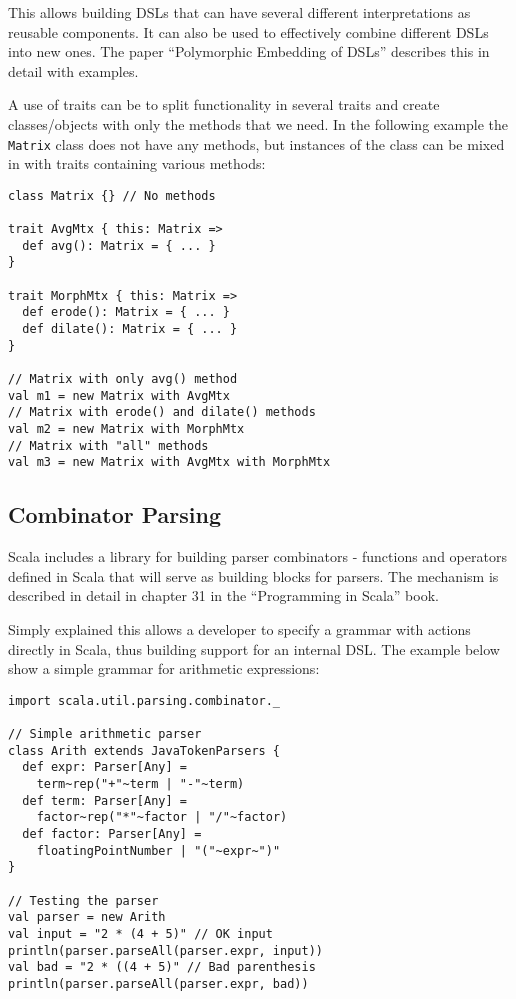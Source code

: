 \documentclass[a4paper,english]{report}
\begin{document}
This allows building DSLs that can have several different
interpretations as reusable components. It can also be used to
effectively combine different DSLs into new ones. The paper
``Polymorphic Embedding of DSLs''\cite{hof08} describes this in detail
with examples.

A use of traits can be to split functionality in several traits and
create classes/objects with only the methods that we need. In the
following example the \texttt{Matrix} class does not have any methods,
but instances of the class can be mixed in with traits containing
various methods:

\begin{lstlisting}
class Matrix {} // No methods

trait AvgMtx { this: Matrix =>
  def avg(): Matrix = { ... }
}

trait MorphMtx { this: Matrix =>
  def erode(): Matrix = { ... }
  def dilate(): Matrix = { ... }
}

// Matrix with only avg() method
val m1 = new Matrix with AvgMtx
// Matrix with erode() and dilate() methods
val m2 = new Matrix with MorphMtx
// Matrix with "all" methods
val m3 = new Matrix with AvgMtx with MorphMtx
\end{lstlisting}

\subsection{Combinator Parsing}
\label{sec:combparse}

Scala includes a library for building parser combinators - functions
and operators defined in Scala that will serve as building blocks for
parsers. The mechanism is described in detail in chapter 31 in the
``Programming in Scala'' book\cite{ode08}.

Simply explained this allows a developer to specify a grammar with
actions directly in Scala, thus building support for an internal
DSL. The example below show a simple grammar for arithmetic
expressions:

\begin{lstlisting}
import scala.util.parsing.combinator._ 

// Simple arithmetic parser
class Arith extends JavaTokenParsers { 
  def expr: Parser[Any] =
    term~rep("+"~term | "-"~term) 
  def term: Parser[Any] =
    factor~rep("*"~factor | "/"~factor) 
  def factor: Parser[Any] =
    floatingPointNumber | "("~expr~")" 
}

// Testing the parser
val parser = new Arith
val input = "2 * (4 + 5)" // OK input
println(parser.parseAll(parser.expr, input))
val bad = "2 * ((4 + 5)" // Bad parenthesis
println(parser.parseAll(parser.expr, bad))
\end{lstlisting}
\end{document}

